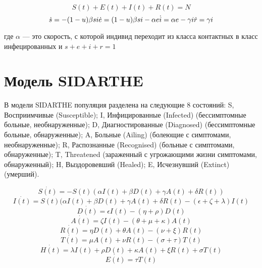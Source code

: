 $$S(t) + E(t) + I(t) + R(t) = N$$
\begin{equation*}
    \dot{s} = -(1 - u)\beta si
    $$ $$
    \dot{e} = (1 - u)\beta si -\alpha e
    $$ $$
    \dot{i}= \alpha e - \gamma i
    $$ $$
    \dot{r} = \gamma i
\end{equation*}

где $\alpha$ --- это скорость, с которой индивид переходит из
класса контактных в класс инфецированных и $ s + e + i + r = 1$


\section{Модель SIDARTHE}\label{1sec:SIDARTHE}

В модели SIDARTHE популяция разделена на следующие 8 состояний: \newline
 S, Восприимчивые (Susceptible); \newline
 I, Инфицированные (Infected) (бессимптомные больные, необнаруженные); \newline
 D, Диагностированные (Diagnosed) (бессимптомные больные, обнаруженные);  \newline
 A, Больные (Ailing) (болеющие с симптомами, необнаруженные);  \newline
 R, Распознанные (Recognised) (больные с симптомами, обнаруженные); \newline
 T, Threatened (зараженный с угрожающими жизни симптомами, обнаруженный);  \newline
 H,  Выздоровевший (Healed); \newline
 E, Исчезнувший (Extinct) (умерший). \newline

\begin{equation*}
    \dot{S(t)} = -S(t)(\alpha I(t)+\beta D(t) +\gamma A(t) + \delta R(t))
  \end{equation*}
  \begin{equation*}
   \dot{I(t)} = S(t)(\alpha I(t) + \beta D(t) +\gamma A(t) +\delta R(t) -(\epsilon+\zeta+\lambda)I(t)
\end{equation*}
\begin{equation*}
    \dot{D(t)} = \epsilon I(t) - (\eta +\rho)D(t)
\end{equation*}
\begin{equation*}
    \dot{A(t)} = \zeta I(t) - (\theta+\mu+\kappa)A(t)
  \end{equation*}
  \begin{equation*}
    \dot{R(t)} = \eta D(t) + \theta A(t) - (\nu+\xi) R(t)
    \end{equation*}
    \begin{equation*}
    \dot{T(t)} =\mu A(t) + \nu R(t) - (\sigma+\tau) T(t)
    \end{equation*}
  \begin{equation*}
    \dot{H(t)} =\lambda I(t) +\rho D(t) +\kappa A(t) +\xi R(t)  +\sigma T(t)
    \end{equation*}
 \begin{equation*}
    \dot{E(t)} = \tau T(t)
\end{equation*}

